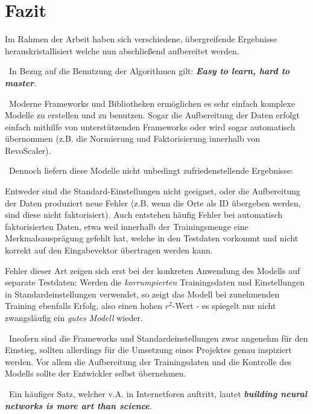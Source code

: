 \chapter{Fazit}
\label{cha:Fazit} \label{cha:Schluss}
Im Rahmen der Arbeit haben sich verschiedene, übergreifende Ergebnisse herauskristallisiert welche nun abschließend aufbereitet werden.

~\newline In Bezug auf die Benutzung der Algorithmen gilt: \textit{\textbf{Easy to learn, hard to master}}. 

~\newline Moderne Frameworks und Bibliotheken ermöglichen es sehr einfach komplexe Modelle zu erstellen und zu benutzen. Sogar die Aufbereitung der Daten erfolgt einfach mithilfe von unterstützenden Frameworks oder wird sogar automatisch übernommen (z.B. die Normierung und Faktorisierung innerhalb von RevoScaler).

~\newline Dennoch liefern diese Modelle nicht unbedingt zufriedenstellende Ergebnisse: 

Entweder sind die Standard-Einstellungen nicht geeignet, oder die Aufbereitung der Daten produziert neue Fehler (z.B. wenn die Orte als ID übergeben werden, sind diese nicht faktorisiert). Auch entstehen häufig Fehler bei automatisch faktorisierten Daten, etwa weil innerhalb der Trainingsmenge eine Merkmalsausprägung gefehlt hat, welche in den Testdaten vorkommt und nicht korrekt auf den Eingabevektor übertragen werden kann. 

Fehler dieser Art zeigen sich erst bei der konkreten Anwendung des Modells auf separate Testdaten: Werden die \textit{korrumpierten} Trainingsdaten und Einstellungen in Standardeinstellungen verwendet, so zeigt das Modell bei zunehmenden Training ebenfalls Erfolg, also einen hohen $r^2$-Wert - es spiegelt nur nicht zwangsläufig ein \textit{gutes Modell} wieder.

~\newline Insofern sind die Frameworks und Standardeinstellungen zwar angenehm für den Einstieg, sollten allerdings für die Umsetzung eines Projektes genau inspiziert werden. Vor allem die Aufbereitung der Trainingsdaten und die Kontrolle des Modells sollte der Entwickler selbst übernehmen.  

~\newline Ein häufiger Satz, welcher v.A. in Internetforen auftritt, lautet \textit{\textbf{building neural networks is more art than science}}.

